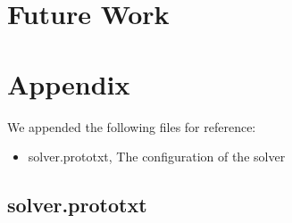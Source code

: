 \documentclass[a4paper,12pt,pagesize,headsepline,bibliography=totoc,titlepage]{scrartcl}
\begin{document}
\section{Future Work}
\label{sec:future}





\newpage
\appendix
\section{Appendix}
We appended the following files for reference:
\begin{itemize}
	\item solver.prototxt, The configuration of the solver
\end{itemize}

\subsection{solver.prototxt}

\end{document}
